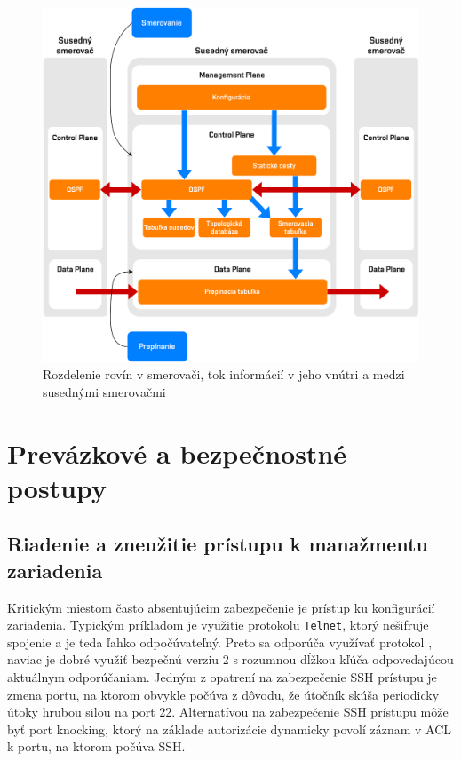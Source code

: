\begin{figure}[H]
	\begin{center}
		\includegraphics[scale=0.6]{obrazky/SDN_planes.pdf}
	\end{center}
	\caption[Rozdelenie rovín v smerovači, tok informácií v jeho vnútri a medzi susednými smerovačmi]{Rozdelenie rovín v smerovači, tok informácií v jeho vnútri a medzi susednými smerovačmi \cite{Pepelnjak2013}}
	\label{fig:sdn-planes}
\end{figure} 


\section{Prevázkové a bezpečnostné postupy}

\subsection*{Riadenie a zneužitie prístupu k manažmentu zariadenia}
Kritickým miestom často absentujúcim zabezpečenie je prístup ku konfigurácií zariadenia. Typickým príkladom je využitie protokolu \texttt{Telnet}, ktorý nešifruje spojenie a je teda ľahko odpočúvateľný. Preto sa odporúča využívať protokol , naviac je dobré využiť bezpečnú verziu 2 s rozumnou dĺžkou kľúča odpovedajúcou aktuálnym odporúčaniam. Jedným z opatrení na zabezpečenie SSH prístupu je zmena portu, na ktorom obvykle počúva z dôvodu, že útočník skúša periodicky útoky hrubou silou na  port 22. Alternatívou na zabezpečenie SSH prístupu môže byť port knocking, ktorý na základe autorizácie dynamicky povolí záznam v ACL k portu, na ktorom počúva SSH.

